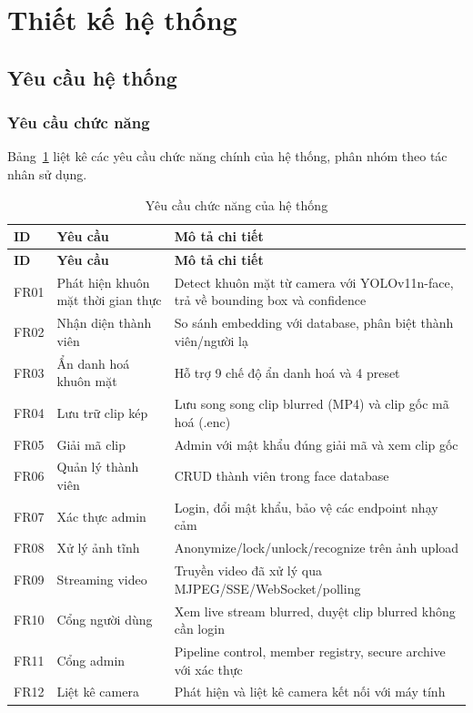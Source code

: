 \section{Thiết kế hệ thống}
\label{sec:thietke}

\subsection{Yêu cầu hệ thống}
\label{subsec:yeucau}

\subsubsection{Yêu cầu chức năng}
\label{subsubsec:yccn}

Bảng~\ref{tab:yccn} liệt kê các yêu cầu chức năng chính của hệ thống, phân nhóm theo tác nhân sử dụng.

\begin{longtable}{|p{}|p{}|p{}|}
\caption{Yêu cầu chức năng của hệ thống}
\label{tab:yccn} \\
\hline
\textbf{ID} & \textbf{Yêu cầu} & \textbf{Mô tả chi tiết} \\
\hline
\endfirsthead
\hline
\textbf{ID} & \textbf{Yêu cầu} & \textbf{Mô tả chi tiết} \\
\hline
\endhead
\hline
\endfoot
FR01 & Phát hiện khuôn mặt thời gian thực & Detect khuôn mặt từ camera với YOLOv11n-face, trả về bounding box và confidence \\
\hline
FR02 & Nhận diện thành viên & So sánh embedding với database, phân biệt thành viên/người lạ \\
\hline
FR03 & Ẩn danh hoá khuôn mặt & Hỗ trợ 9 chế độ ẩn danh hoá và 4 preset \\
\hline
FR04 & Lưu trữ clip kép & Lưu song song clip blurred (MP4) và clip gốc mã hoá (.enc) \\
\hline
FR05 & Giải mã clip & Admin với mật khẩu đúng giải mã và xem clip gốc \\
\hline
FR06 & Quản lý thành viên & CRUD thành viên trong face database \\
\hline
FR07 & Xác thực admin & Login, đổi mật khẩu, bảo vệ các endpoint nhạy cảm \\
\hline
FR08 & Xử lý ảnh tĩnh & Anonymize/lock/unlock/recognize trên ảnh upload \\
\hline
FR09 & Streaming video & Truyền video đã xử lý qua MJPEG/SSE/WebSocket/polling \\
\hline
FR10 & Cổng người dùng & Xem live stream blurred, duyệt clip blurred không cần login \\
\hline
FR11 & Cổng admin & Pipeline control, member registry, secure archive với xác thực \\
\hline
FR12 & Liệt kê camera & Phát hiện và liệt kê camera kết nối với máy tính \\
\hline
\end{longtable}

